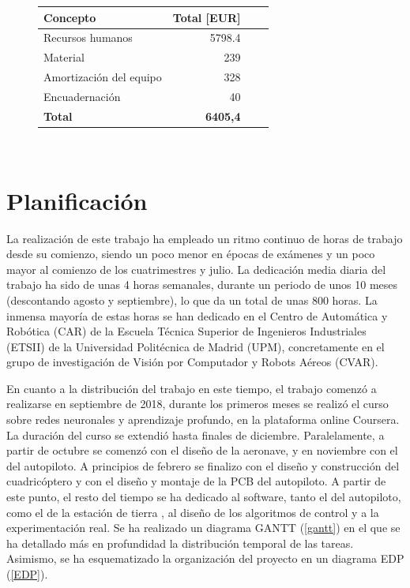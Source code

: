 \begin{figure}[htb!]
	\centering
	\begin{tabular}{|l|r|r|r|}
		\hline
		\textbf{Concepto} &Total [EUR]\\
		\hline
		Recursos humanos & 5798.4\\
		Material &239\\
		Amortización del equipo & 328\\
		Encuadernación&40\\
		
		\hline
		\textbf{Total}   & \textbf{6405,4}\\
		\hline
	\end{tabular}\\
\end{figure}





\section{Planificación}
La realización de este trabajo ha empleado un ritmo continuo de horas de trabajo desde su comienzo, siendo un poco menor en épocas de exámenes y un poco mayor al comienzo de los cuatrimestres y julio. La dedicación media diaria del trabajo ha sido de unas 4 horas semanales, durante un periodo de unos 10 meses (descontando agosto y septiembre), lo que da un total de unas 800 horas. La inmensa mayoría de estas horas se han dedicado en el Centro de Automática y Robótica (CAR) de la Escuela Técnica Superior de Ingenieros Industriales (ETSII) de la Universidad Politécnica de Madrid (UPM), concretamente en el grupo de investigación de Visión por Computador y Robots Aéreos (CVAR).

En cuanto a la distribución del trabajo en este tiempo, el trabajo comenzó a realizarse en septiembre de 2018, durante los primeros meses se realizó el curso sobre redes neuronales y aprendizaje profundo, en la plataforma online Coursera. La duración del curso se extendió hasta finales de diciembre. Paralelamente, a partir de octubre se comenzó con el diseño de la aeronave, y en noviembre con el del autopiloto. A principios de febrero se finalizo con el diseño y construcción del cuadricóptero y con el diseño y montaje de la PCB del autopiloto. A partir de este punto, el resto del tiempo se ha dedicado al software, tanto el del autopiloto, como el de la estación de tierra , al diseño de los algoritmos de control y a la experimentación real. Se ha realizado un diagrama GANTT (\cref{gantt}) en el que se ha detallado más en profundidad la distribución temporal de las tareas. Asimismo, se ha esquematizado la organización del proyecto en un diagrama EDP (\cref{EDP}). 

